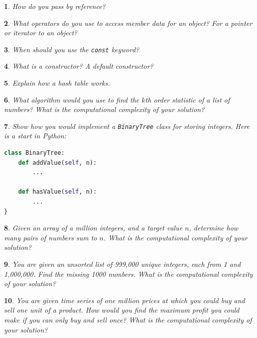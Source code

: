 \documentclass{report}
\newtheorem{problem}{}
\numberwithin{problem}{chapter} %
\begin{document}
\begin{problem}
How do you pass by reference?
\end{problem}

\begin{problem}
What operators do you use to access member data for an object? For a pointer or iterator to an object?
\end{problem}

\begin{problem}
When should you use the \verb|const| keyword?
\end{problem}

\begin{problem}
What is a constructor? A default constructor? 
\end{problem}

\begin{problem}
Explain how a hash table works.
\end{problem}

\begin{problem}
What algorithm would you use to find the $k$th order statistic of a list of numbers? What is the computational complexity of your solution?
\end{problem}

\begin{problem}
Show how you would implement a \verb|BinaryTree| class for storing integers. Here is a start in Python:
\begin{lstlisting}[language=python]
class BinaryTree:
	def addValue(self, n):
   		...
		
	def hasValue(self, n):
   		...
}
\end{lstlisting}
\end{problem}

\begin{problem}
Given an array of a million integers, and a target value $n$, determine how many pairs of numbers sum to $n$. What is the computational complexity of your solution?
\end{problem}

\begin{problem}
You are given an unsorted list of 999,000 unique integers, each from 1 and 1,000,000. Find the missing 1000 numbers. What is the computational complexity of your solution?
\end{problem}

\begin{problem}
You are given time series of one million prices at which you could buy and sell one unit of a product. How would you find the maximum profit you could make if you can only buy and sell once? What is the computational complexity of your solution?
\end{problem}
\end{document}

